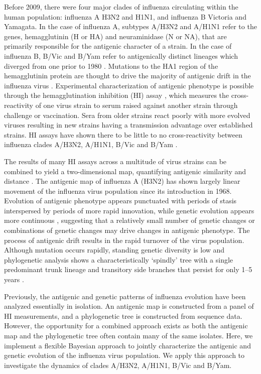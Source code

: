 \documentclass[11pt,oneside,letterpaper]{article}
\begin{document}
Before 2009, there were four major clades of influenza circulating within the human population: influenza A H3N2 and H1N1, and influenza B Victoria and Yamagata. 
In the case of influenza A, subtypes A/H3N2 and A/H1N1 refer to the genes, hemagglutinin (H or HA) and neuraminidase (N or NA), that are primarily responsible for the antigenic character of a strain. 
In the case of influenza B, B/Vic and B/Yam refer to antigenically distinct lineages which diverged from one prior to 1980 \cite{Rota92}.
Mutations to the HA1 region of the hemagglutinin protein are thought to drive the majority of antigenic drift in the influenza virus \cite{Nelson07NatRevGenet}. 
Experimental characterization of antigenic phenotype is possible through the hemagglutination inhibition (HI) assay \cite{Hirst43}, which measures the cross-reactivity of one virus strain to serum raised against another strain through challenge or vaccination. 
Sera from older strains react poorly with more evolved viruses resulting in new strains having a transmission advantage over established strains.
HI assays have shown there to be little to no cross-reactivity between influenza clades A/H3N2, A/H1N1, B/Vic and B/Yam \cite{Hay01}.

The results of many HI assays across a multitude of virus strains can be combined to yield a two-dimensional map, quantifying antigenic similarity and distance \cite{Smith04}. 
The antigenic map of influenza A (H3N2) has shown largely linear movement of the influenza virus population since its introduction in 1968. 
Evolution of antigenic phenotype appears punctuated with periods of stasis interspersed by periods of more rapid innovation, while genetic evolution appears more continuous \cite{Smith04}, suggesting that a relatively small number of genetic changes or combinations of genetic changes may drive changes in antigenic phenotype. 
The process of antigenic drift results in the rapid turnover of the virus population. 
Although mutation occurs rapidly, standing genetic diversity is low and phylogenetic analysis shows a characteristically `spindly' tree with a single predominant trunk lineage and transitory side branches that persist for only 1--5 years \cite{Fitch97}.

Previously, the antigenic and genetic patterns of influenza evolution have been analyzed essentially in isolation. 
An antigenic map is constructed from a panel of HI measurements, and a phylogenetic tree is constructed from sequence data. 
However, the opportunity for a combined approach exists as both the antigenic map and the phylogenetic tree often contain many of the same isolates. 
Here, we implement a flexible Bayesian approach to jointly characterize the antigenic and genetic evolution of the influenza virus population. 
We apply this approach to investigate the dynamics of clades A/H3N2, A/H1N1, B/Vic and B/Yam. 
\end{document}
